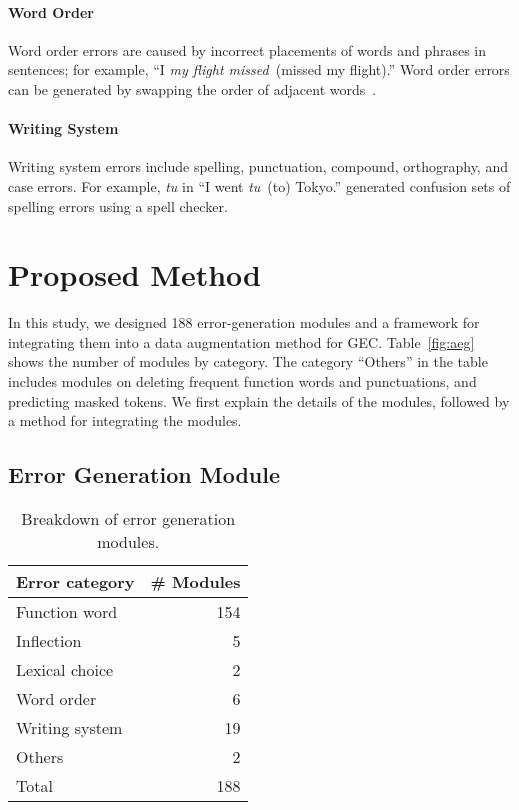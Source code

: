 \documentclass[11pt]{article}
\begin{document}
\paragraph{Word Order}
Word order errors are caused by incorrect placements of words and phrases in sentences;
for example, ``I \textit{my flight missed}~(\textrightarrow missed my flight).''
Word order errors can be generated by swapping the order of adjacent words~\citep{grundkiewicz-etal-2019-neural}.

\paragraph{Writing System}
Writing system errors include spelling, punctuation, compound, orthography, and case errors.
For example, \textit{tu} in ``I went \textit{tu}~(\textrightarrow to) Tokyo.''
\citet{grundkiewicz-etal-2019-neural} generated confusion sets of spelling errors using a spell checker.

\section{Proposed Method}

In this study, we designed 188 error-generation modules and a framework for integrating them into a data augmentation method for GEC.
Table~\ref{fig:aeg} shows the number of modules by category.
The category ``Others'' in the table includes modules on deleting frequent function words and punctuations, and predicting masked tokens.
We first explain the details of the modules, followed by a method for integrating the modules.

\subsection{Error Generation Module}

\begin{table}[t]
	\footnotesize
	\fontsize{8.0pt}{9.0pt}\selectfont
	\centering
	\begin{tabular}{lr}
		\hline
		\multicolumn{1}{c}{Error category} & \multicolumn{1}{c}{\# Modules} \\
		\hline
		Function word 
			& 154 \\
		Inflection
			& 5 \\
		Lexical choice
			& 2 \\
		Word order
			& 6 \\
		Writing system
			& 19 \\
		Others
			& 2 \\
		\hline
		Total
			& 188 \\
		\hline
	\end{tabular}
	\caption{Breakdown of error generation modules.}
	\label{tab:egu}
\end{table}
\end{document}
